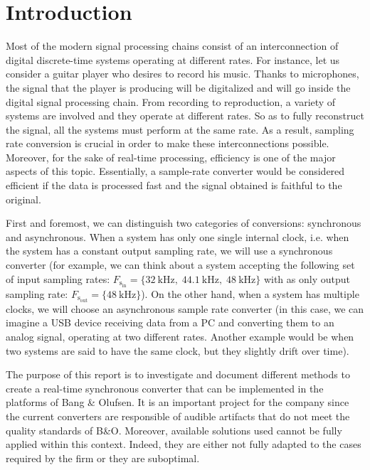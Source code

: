 

\chapter{Introduction} \label{gen_intro}%

\label{Chapter1} %

Most of the modern signal processing chains consist of an interconnection of digital discrete-time systems operating at different rates. For instance, let us consider a guitar player who desires to record his music. Thanks to microphones, the signal that the player is producing will be digitalized and will go inside the digital signal processing chain. From recording to reproduction, a variety of systems are involved and they operate at different rates. So as to fully reconstruct the signal, all the systems must perform at the same rate. As a result, sampling rate conversion is crucial in order to make these interconnections possible. Moreover, for the sake of real-time processing, efficiency is one of the major aspects of this topic. Essentially, a sample-rate converter would be considered efficient if the data is processed fast and the signal obtained is faithful to the original.


 
First and foremost, we can distinguish two categories of conversions: synchronous and asynchronous. When a system has only one single internal clock, i.e. when the system has a constant output sampling rate, we will use a synchronous converter (for example, we can think about a system accepting the following set of input sampling rates: $ F_\mathrm{s_{in}} = \{\SI{32}{\kilo \Hz}, \;  \SI{44.1}{\kilo \Hz}, \; \SI{48}{\kilo \Hz}  \}  $ with as only output sampling rate: $ F_\mathrm{s_{out}} = \{\SI{48}{\kilo \Hz} \}$). On the other hand, when a system has multiple clocks, we will choose an asynchronous sample rate converter (in this case, we can imagine a USB device receiving data from a PC and converting them to an analog signal, operating at two different rates. Another example would be when two systems are said to have the same clock, but they slightly drift over time). 


The purpose of this report is to investigate and document different methods to create a real-time synchronous converter that can be implemented in the platforms of Bang \& Olufsen. It is an important project for the company since the current converters are responsible of audible artifacts that do not meet the quality standards of B\&O. Moreover, available solutions used cannot be fully applied within this context. Indeed, they are either not fully adapted to the cases required by the firm or they are suboptimal. 


